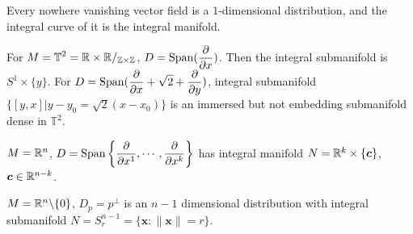 \begin{example}
    Every nowhere vanishing vector field is a  $ 1 $-dimensional distribution,  and the integral curve of it is the integral manifold.
\end{example}

\begin{example}
    For  $ \displaystyle M=\mathbb{T}^2=\mathbb R\times\mathbb R/_{\mathbb Z\times \mathbb Z} $,  $ D=\displaystyle\mathrm{Span}(\frac{\partial}{\partial x}) $. Then the integral submanifold is  $ S^1\times\{y\} $. For  $ D=\displaystyle\mathrm{Span}(\frac{\partial }{\partial x}+\sqrt{2}+\frac{\partial }{\partial y}) $, integral submanifold  $ \{[y,x]|y-y_0=\sqrt{2}(x-x_0)\} $ is an immersed but not embedding submanifold dense in  $ \mathbb T^2 $. 
\end{example}
\begin{example}
     $ M=\mathbb R^n  $, $ D=\mathrm{Span}\left\{\displaystyle\frac{\partial }{\partial x^1},\cdots,\frac{\partial }{\partial x^k}\right\} $ has integral manifold  $ N=\mathbb R^k\times\{\boldsymbol{c}\} $,  $ \boldsymbol{c}\in \mathbb R^{n-k} $.  
\end{example}

\begin{example}
     $ M=\mathbb R^n\backslash\{0\} $,  $ D_p=p^\perp $  is an  $ n-1 $  dimensional distribution with integral submanifold  $ N=S_r^{n-1}=\{\boldsymbol{x}:\|\boldsymbol{x}\|=r\} $.
\end{example}

